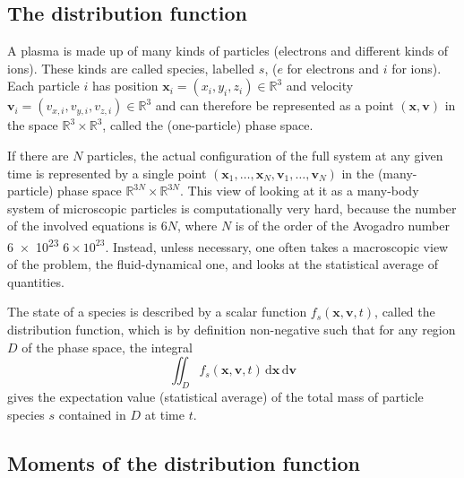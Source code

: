 \documentclass{article}
\begin{document}

\subsection{The distribution function}

A plasma is made up of many kinds of particles (electrons and different kinds of ions). These kinds are called species, labelled $s$, ($e$ for electrons and $i$ for ions). Each particle $i$ has position $\bm{x}_i = (x_i, y_i, z_i) \in \mathbb{R}^3$ and velocity $\bm{v}_i = (v_{x,i}, v_{y,i}, v_{z,i}) \in \mathbb{R}^3$ and can therefore be represented as a point $(\bm{x}, \bm{v})$ in the space $\mathbb{R}^3 \times \mathbb{R}^3$, called the (one-particle) phase space.

If there are $N$ particles, the actual configuration of the full system at any given time is represented by a single point $(\bm{x}_1, \dots, \bm{x}_N, \bm{v}_1, \dots, \bm{v}_N)$ in the (many-particle) phase space $\mathbb{R}^{3N} \times \mathbb{R}^{3N}$. This view of looking at it as a many-body system of microscopic particles is computationally very hard, because the number of the involved equations is $6N$, where $N$ is of the order of the Avogadro number \num{6e23} $6 \times 10^23$. Instead, unless necessary, one often takes a macroscopic view of the problem, the fluid-dynamical one, and looks at the statistical average of quantities.

The state of a species is described by a scalar function $f_s(\bm{x}, \bm{v}, t)$, called the distribution function, which is by definition non-negative such that for any region $D$ of the phase space, the integral
%
\begin{equation}
    \iint_D f_s(\bm{x}, \bm{v}, t) \, \mathrm{d}\bm{x} \, \mathrm{d}\bm{v}
\end{equation}
%
gives the expectation value (statistical average) of the total mass of particle species $s$ contained in $D$ at time $t$.

\subsection{Moments of the distribution function}
\end{document}
